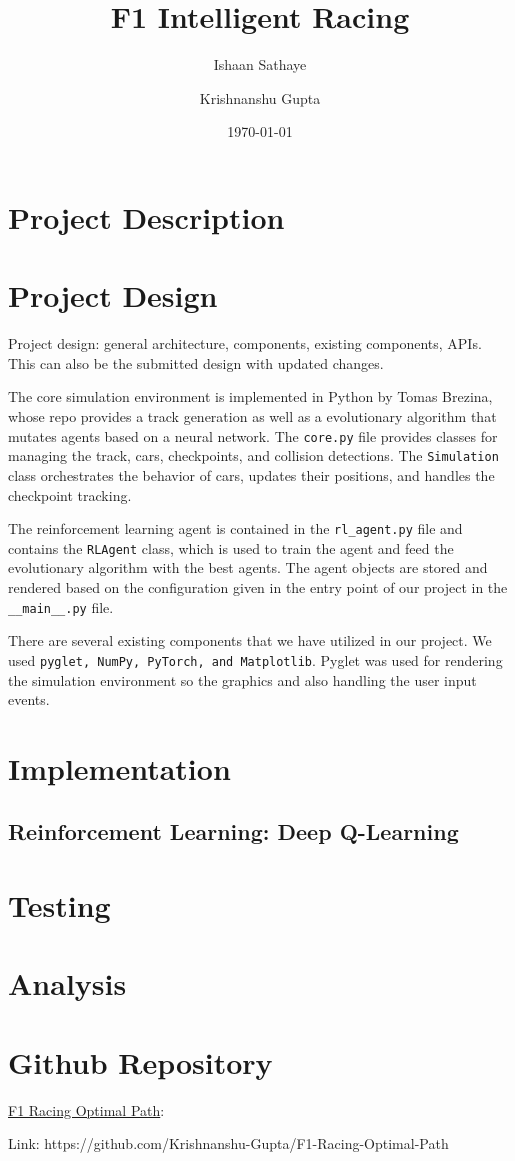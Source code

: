 \documentclass[12pt]{article}
\begin{document}
\title{F1 Intelligent Racing}

\author{%
   Ishaan Sathaye%
   \and%
   Krishnanshu Gupta%
}

\date{\today}

\maketitle



\section{Project Description}

\section{Project Design}
Project design: general architecture, components, existing components, APIs. 
This can also be the submitted design with updated changes.

The core simulation environment is implemented in Python by Tomas Brezina, whose 
repo provides a track generation as well as a evolutionary algorithm that mutates 
agents based on a neural network. The \texttt{core.py} file provides classes for 
managing the track, cars, checkpoints, and collision detections. The 
\texttt{Simulation} class orchestrates the behavior of cars, updates their 
positions, and handles the checkpoint tracking.

The reinforcement learning agent is contained in the \texttt{rl\_agent.py} file 
and contains the \texttt{RLAgent} class, which is used to train the agent and 
feed the evolutionary algorithm with the best agents. The agent objects are 
stored and rendered based on the configuration given in the entry point of our 
project in the \texttt{\_\_main\_\_.py} file.

There are several existing components that we have utilized in our project. We 
used \texttt{pyglet, NumPy, PyTorch, and Matplotlib}. Pyglet was used for 
rendering the simulation environment so the graphics and also handling the user 
input events. 

\section{Implementation}

\subsection{Reinforcement Learning: Deep Q-Learning}

\section{Testing}

\section{Analysis}

\section{Github Repository}
\href{https://github.com/Krishnanshu-Gupta/F1-Racing-Optimal-Path}{F1 Racing 
Optimal Path}:

Link: https://github.com/Krishnanshu-Gupta/F1-Racing-Optimal-Path
\end{document}

